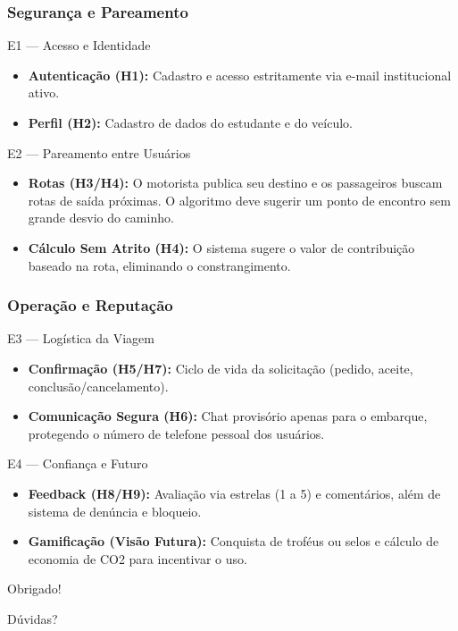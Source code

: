 \documentclass[aspectratio=169]{beamer}
\begin{document}
\begin{frame}
\frametitle{Segurança e Pareamento}
\begin{block}{E1 — Acesso e Identidade}
    \begin{itemize}
        \item \textbf{Autenticação (H1):} Cadastro e acesso estritamente via e-mail institucional ativo.
        \item \textbf{Perfil (H2):} Cadastro de dados do estudante e do veículo.
    \end{itemize}
\end{block}

\begin{block}{E2 — Pareamento entre Usuários}
    \begin{itemize}
        \item \textbf{Rotas (H3/H4):} O motorista publica seu destino e os passageiros buscam rotas de saída próximas. O algoritmo deve sugerir um ponto de encontro sem grande desvio do caminho.
        \item \textbf{Cálculo Sem Atrito (H4):} O sistema sugere o valor de contribuição baseado na rota, eliminando o constrangimento.
    \end{itemize}
\end{block}
\end{frame}

\begin{frame}
\frametitle{Operação e Reputação}
\begin{block}{E3 — Logística da Viagem}
    \begin{itemize}
        \item \textbf{Confirmação (H5/H7):} Ciclo de vida da solicitação (pedido, aceite, conclusão/cancelamento).
        \item \textbf{Comunicação Segura (H6):} Chat provisório apenas para o embarque, protegendo o número de telefone pessoal dos usuários.
    \end{itemize}
\end{block}

\begin{block}{E4 — Confiança e Futuro}
    \begin{itemize}
        \item \textbf{Feedback (H8/H9):} Avaliação via estrelas (1 a 5) e comentários, além de sistema de denúncia e bloqueio.
        \item \textbf{Gamificação (Visão Futura):} Conquista de troféus ou selos e cálculo de economia de CO2 para incentivar o uso.
    \end{itemize}
\end{block}
\end{frame}

\begin{frame}
\Large{\centerline{Obrigado!}}
\Large{\centerline{Dúvidas?}}

\vspace{1cm}

\end{frame}
\end{document}

